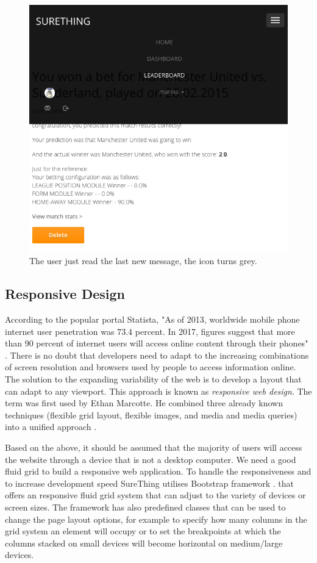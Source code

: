 \begin{figure}[H]
	\begin{center}
		\includegraphics[width=.60\textwidth]{impl/images/noMoreNewMessages}
		\caption{The user just read the last new message, the icon turns grey.} 
		\label{fig:nomorenewmessages}
	\end{center}
\end{figure}

\subsection{Responsive Design}
According to the popular portal Statista, "As of 2013, worldwide mobile phone internet user penetration was 73.4 percent. In 2017, figures suggest that more than 90 percent of internet users will access online content through their phones" \citep{statistaReport}. There is no doubt that developers need to adapt to the increasing combinations of screen resolution and browsers used by people to access information online. The solution to the expanding variability of the web is to develop a layout that can adapt to any viewport. This approach is known as \emph{responsive web design}. The term was first used by Ethan Marcotte. He combined three already known techniques (flexible grid layout, flexible images, and media and media queries) into a unified approach \citep{book:frain2012responsive}.

Based on the above, it should be assumed that the majority of users will access the website through a device that is not a desktop computer. We need a good fluid grid to build a responsive web application. To handle the responsiveness and to increase development speed SureThing utilises Bootstrap framework \citet{documentation:Bootstrap3}. that offers an responsive fluid grid system that can adjust to the variety of devices or screen sizes. The framework has also predefined classes that can be used to change the page layout options, for example to specify how many columns in the grid system an element will occupy or to set the breakpoints at which the columns stacked on small devices will become horizontal on medium/large devices.


